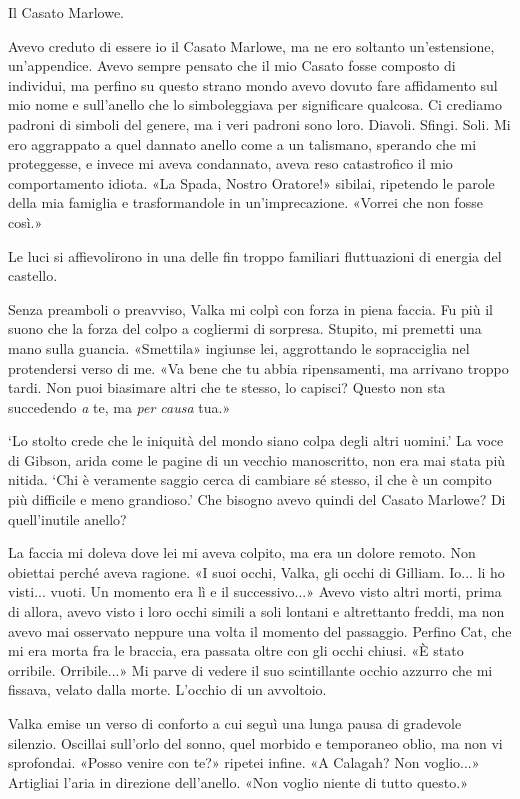 Il Casato Marlowe.

Avevo creduto di essere io il Casato Marlowe, ma ne ero soltanto
un'estensione, un'appendice. Avevo sempre pensato che il mio Casato
fosse composto di individui, ma perfino su questo strano mondo avevo
dovuto fare affidamento sul mio nome e sull'anello che lo simboleggiava
per significare qualcosa. Ci crediamo padroni di simboli del genere, ma
i veri padroni sono loro. Diavoli. Sfingi. Soli. Mi ero aggrappato a
quel dannato anello come a un talismano, sperando che mi proteggesse, e
invece mi aveva condannato, aveva reso catastrofico il mio comportamento
idiota. «La Spada, Nostro Oratore!» sibilai, ripetendo le parole della
mia famiglia e trasformandole in un'imprecazione. «Vorrei che non fosse
così.»

Le luci si affievolirono in una delle fin troppo familiari fluttuazioni
di energia del castello.

Senza preamboli o preavviso, Valka mi colpì con forza in piena faccia.
Fu più il suono che la forza del colpo a cogliermi di sorpresa. Stupito,
mi premetti una mano sulla guancia. «Smettila» ingiunse lei, aggrottando
le sopracciglia nel protendersi verso di me. «Va bene che tu abbia
ripensamenti, ma arrivano troppo tardi. Non puoi biasimare altri che te
stesso, lo capisci? Questo non sta succedendo \emph{a} te, ma \emph{per
	causa} tua.»

`Lo stolto crede che le iniquità del mondo siano colpa degli altri
uomini.' La voce di Gibson, arida come le pagine di un vecchio
manoscritto, non era mai stata più nitida. `Chi è veramente saggio cerca
di cambiare sé stesso, il che è un compito più difficile e meno
grandioso.' Che bisogno avevo quindi del Casato Marlowe? Di
quell'inutile anello?

La faccia mi doleva dove lei mi aveva colpito, ma era un dolore remoto.
Non obiettai perché aveva ragione. «I suoi occhi, Valka, gli occhi di
Gilliam. Io... li ho visti... vuoti. Un momento era lì e il
successivo...» Avevo visto altri morti, prima di allora, avevo visto i
loro occhi simili a soli lontani e altrettanto freddi, ma non avevo mai
osservato neppure una volta il momento del passaggio. Perfino Cat, che
mi era morta fra le braccia, era passata oltre con gli occhi chiusi. «È
stato orribile. Orribile...» Mi parve di vedere il suo scintillante
occhio azzurro che mi fissava, velato dalla morte. L'occhio di un
avvoltoio.

Valka emise un verso di conforto a cui seguì una lunga pausa di
gradevole silenzio. Oscillai sull'orlo del sonno, quel morbido e
temporaneo oblio, ma non vi sprofondai. «Posso venire con te?» ripetei
infine. «A Calagah? Non voglio...» Artigliai l'aria in direzione
dell'anello. «Non voglio niente di tutto questo.»

